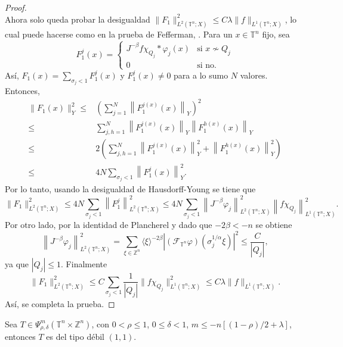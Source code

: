 \begin{proof}
\begin{equation*}
	\end{equation*}
	Ahora solo queda probar la desigualdad $\|F_1\|_{L^2(\mathbb{T}^n; X)}^2 \leq C\lambda \|f\|_{L^1(\mathbb{T}^n; X)}$, lo cual puede hacerse como en la prueba de Fefferman, \cite{cardona-ruzhansky}. Para un $x \in \mathbb{T}^n$ fijo, sea
	\begin{equation*}
		F_1^j(x) = \begin{cases}
			J^{-\beta} f\chi_{Q_j}*\varphi_j(x) & \text{si }x \nsim Q_j \\ 0 & \text{si no}.
		\end{cases}
	\end{equation*}
	Así, $F_1(x)=\sum_{\sigma_j <1} F_1^j(x)$ y $F_1^j(x) \neq 0$ para a lo sumo $N$ valores. Entonces,
	\begin{align*}
		\|F_1(x)\|_Y^2 \leq & \left( \sum_{j=1}^N\left\|F_1^{j(x)}(x)\right\|_Y \right)^2 \\
		\leq & \sum_{j,h=1}^N\left\|F_1^{j(x)}(x)\right\|_Y \left\|F_1^{h(x)}(x)\right\|_Y \\
		\leq & 2\left( \sum_{j,h=1}^N \left\|F_1^{j(x)}(x)\right\|_Y^2 + \left\|F_1^{h(x)}(x)\right\|_Y^2 \right) \\
		\leq & 4N\sum_{\sigma_j < 1}\left\|F_1^j(x)\right\|_Y^2.
	\end{align*}
	Por lo tanto, usando la desigualdad de Hausdorff-Young se tiene que
	\begin{equation*}
		\|F_1\|_{L^2(\mathbb{T}^n; X)}^2 \leq 4N\sum_{\sigma_j<1} \left\| F_1^j \right\|_{L^2(\mathbb{T}^n; X)}^2 \leq 4N\sum_{\sigma_j<1} \left\| J^{-\beta} \varphi_j \right\|_{L^2(\mathbb{T}^n; X)}^2\left\| f\chi_{Q_j} \right\|_{L^1(\mathbb{T}^n; X)}^2.
	\end{equation*}
	Por otro lado, por la identidad de Plancherel y dado que $-2\beta < -n$ se obtiene
	\begin{equation*}
		\left\| J^{-\beta} \varphi_j \right\|_{L^2(\mathbb{T}^n; X)}^2 = \sum_{\xi \in \mathbb{Z}^n } \langle\xi\rangle^{-2\beta} \left|(\mathcal{F}_{\mathbb{T}^n} \varphi)\left(\sigma_j^{1/\alpha}\xi\right)\right|^2 \leq     \frac{C}{|Q_j|},
	\end{equation*}
	ya que $|Q_j| \leq 1$. Finalmente
	\begin{equation*}
		\|F_1\|_{L^2(\mathbb{T}^n; X)}^2 \leq C\sum_{\sigma_j<1}\frac{1}{|Q_j|} \|f\chi_{Q_j}\|_{L^1(\mathbb{T}^n; X)}^2 \leq C\lambda \|f\|_{L^1(\mathbb{T}^n; X)}.
	\end{equation*}
	Así, se completa la prueba.
\end{proof}
\begin{theorem}
	Sea $T \in \Psi^m_{\rho, \delta}(\mathbb{T}^n \times \mathbb{Z}^n) $, con $0 < \rho \leq 1$, $0 \leq \delta < 1$, $m \leq - n [(1-\rho)/2 + \lambda] $, entonces $T$ es del tipo débil $(1, 1)$.
\end{theorem}
